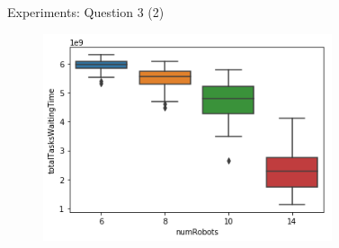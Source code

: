 \begin{frame}{Experiments: Question 3 (2)}
 \begin{figure}[!hbt]
        \centering
        \includegraphics[width=8.5cm]{imgs/question3-plot1}
    \end{figure}
\end{frame}

